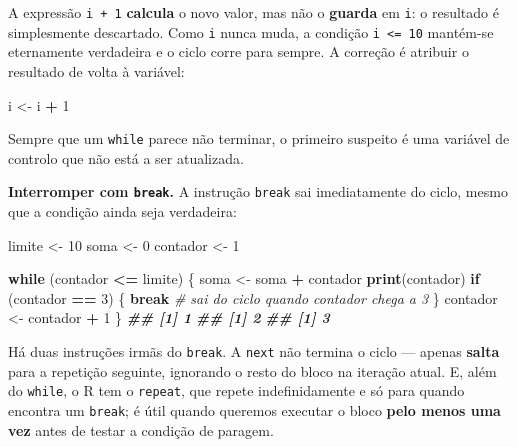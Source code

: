 \documentclass[
  portuguese,
  11pt,
  openany]{book}
\newenvironment{Shaded}{\begin{snugshade}}{\end{snugshade}}
\newcommand{\CommentTok}[1]{\textcolor[rgb]{0.56,0.35,0.01}{\textit{#1}}}
\newcommand{\ControlFlowTok}[1]{\textcolor[rgb]{0.13,0.29,0.53}{\textbf{#1}}}
\newcommand{\DecValTok}[1]{\textcolor[rgb]{0.00,0.00,0.81}{#1}}
\newcommand{\DocumentationTok}[1]{\textcolor[rgb]{0.56,0.35,0.01}{\textbf{\textit{#1}}}}
\newcommand{\FunctionTok}[1]{\textcolor[rgb]{0.13,0.29,0.53}{\textbf{#1}}}
\newcommand{\NormalTok}[1]{#1}
\newcommand{\OtherTok}[1]{\textcolor[rgb]{0.56,0.35,0.01}{#1}}
\newcommand{\SpecialCharTok}[1]{\textcolor[rgb]{0.81,0.36,0.00}{\textbf{#1}}}
\begin{document}
A expressão \texttt{i\ +\ 1} \textbf{calcula} o novo valor, mas não o \textbf{guarda} em \texttt{i}: o
resultado é simplesmente descartado. Como \texttt{i} nunca muda, a condição \texttt{i\ \textless{}=\ 10}
mantém-se eternamente verdadeira e o ciclo corre para sempre. A correção é atribuir o
resultado de volta à variável:

\begin{Shaded}
\begin{Highlighting}[]
\NormalTok{i }\OtherTok{\textless{}{-}}\NormalTok{ i }\SpecialCharTok{+} \DecValTok{1}
\end{Highlighting}
\end{Shaded}

Sempre que um \texttt{while} parece não terminar, o primeiro suspeito é uma variável de
controlo que não está a ser atualizada.

\textbf{Interromper com \texttt{break}.} A instrução \texttt{break} sai imediatamente do ciclo, mesmo
que a condição ainda seja verdadeira:

\begin{Shaded}
\begin{Highlighting}[]
\NormalTok{limite }\OtherTok{\textless{}{-}} \DecValTok{10}
\NormalTok{soma }\OtherTok{\textless{}{-}} \DecValTok{0}
\NormalTok{contador }\OtherTok{\textless{}{-}} \DecValTok{1}

\ControlFlowTok{while}\NormalTok{ (contador }\SpecialCharTok{\textless{}=}\NormalTok{ limite) \{}
\NormalTok{  soma }\OtherTok{\textless{}{-}}\NormalTok{ soma }\SpecialCharTok{+}\NormalTok{ contador}
  \FunctionTok{print}\NormalTok{(contador)}
  \ControlFlowTok{if}\NormalTok{ (contador }\SpecialCharTok{==} \DecValTok{3}\NormalTok{) \{}
    \ControlFlowTok{break}            \CommentTok{\# sai do ciclo quando contador chega a 3}
\NormalTok{  \}}
\NormalTok{  contador }\OtherTok{\textless{}{-}}\NormalTok{ contador }\SpecialCharTok{+} \DecValTok{1}
\NormalTok{\}}
\DocumentationTok{\#\# [1] 1}
\DocumentationTok{\#\# [1] 2}
\DocumentationTok{\#\# [1] 3}
\end{Highlighting}
\end{Shaded}

Há duas instruções irmãs do \texttt{break}. A \texttt{next} não termina o ciclo --- apenas \textbf{salta}
para a repetição seguinte, ignorando o resto do bloco na iteração atual. E, além do
\texttt{while}, o R tem o \texttt{repeat}, que repete indefinidamente e só para quando encontra um
\texttt{break}; é útil quando queremos executar o bloco \textbf{pelo menos uma vez} antes de
testar a condição de paragem.
\end{document}
